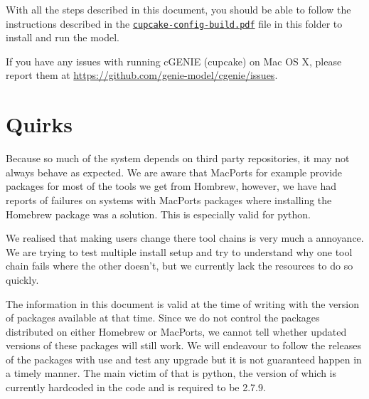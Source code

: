 \documentclass{scrartcl}
\begin{document}
With all the steps described in this document, you should be able to follow the
instructions described in the
\href{run:./cupcake-config-build.pdf}{\texttt{cupcake-config-build.pdf}} file
in this folder to install and run the model.

If you have any issues with running cGENIE (cupcake) on Mac OS X, please report
them at \url{https://github.com/genie-model/cgenie/issues}.

\section{Quirks}

Because so much of the system depends on third party repositories, it may not
always behave as expected. We are aware that MacPorts for example provide
packages for most of the tools we get from Hombrew, however, we have had
reports of failures on systems with MacPorts packages where installing the
Homebrew package was a solution. This is especially valid for python.

We realised that making users change there tool chains is very much a
annoyance. We are trying to test multiple install setup and try to understand
why one tool chain fails where the other doesn't, but we currently lack the
resources to do so quickly.

The information in this document is valid at the time of writing with the
version of packages available at that time. Since we do not control the
packages distributed on either Homebrew or MacPorts, we cannot tell whether
updated versions of these packages will still work. We will endeavour to follow
the releases of the packages with use and test any upgrade but it is not
guaranteed happen in a timely manner. The main victim of that is python, the
version of which is currently hardcoded in the code and is required to be
2.7.9.
\end{document}
